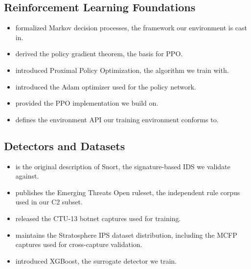 \documentclass[12pt,a4paper]{report}
\begin{document}
\subsection{Reinforcement Learning Foundations}

\begin{itemize}
  \item \citet{puterman1994markov} formalized Markov decision processes, the framework our environment is cast in.
  
  \item \citet{sutton2000policy} derived the policy gradient theorem, the basis for PPO.
  
  \item \citet{schulman2017proximal} introduced Proximal Policy Optimization, the algorithm we train with.
  
  \item \citet{kingma2014adam} introduced the Adam optimizer used for the policy network.
  
  \item \citet{stable_baselines3} provided the PPO implementation we build on.
  
  \item \citet{gymnasium} defines the environment API our training environment conforms to.
\end{itemize}

\subsection{Detectors and Datasets}

\begin{itemize}
  \item \citet{snort_project} is the original description of Snort, the signature-based IDS we validate against.
  
  \item \citet{emerging_threats} publishes the Emerging Threats Open ruleset, the independent rule corpus used in our C2 subset.
  
  \item \citet{stratosphere_ctu13} released the CTU-13 botnet captures used for training.
  
  \item \citet{ctu_datasets} maintains the Stratosphere IPS dataset distribution, including the MCFP captures used for cross-capture validation.
  
  \item \citet{chen2016xgboost} introduced XGBoost, the surrogate detector we train.
\end{itemize}
\end{document}
